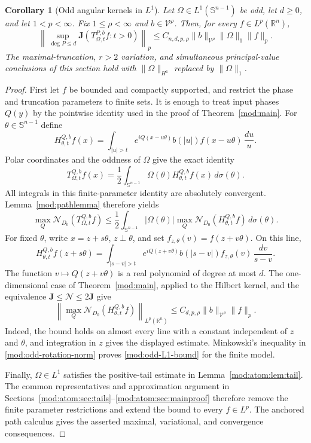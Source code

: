 \documentclass[11pt]{article}
\numberwithin{equation}{section}
\newtheorem{corollary}[theorem]{Corollary}
\theoremstyle{remark}
\theoremstyle{definition}
\newcommand{\R}{\mathbb R}
\newcommand{\Sph}{\mathbb S}
\newcommand{\NN}{\mathcal N}
\begin{document}
\begin{corollary}[Odd angular kernels in \texorpdfstring{$L^1$}{L1}]
\label{mod:odd-L1}
Let $\Omega\in L^1(\Sph^{n-1})$ be odd, let $d\ge0$, and let
$1<p<\infty$. Fix $1\le\rho<\infty$ and $b\in\mathcal V^\rho$.
Then, for every $f\in L^p(\R^n)$,
\begin{equation}\label{mod:odd-L1-bound}
 \left\|\sup_{\deg P\le d}
 \mathbf J(T^{P,b}_{\Omega,t}f:t>0)\right\|_p
 \le C_{n,d,p,\rho}\|b\|_{\mathcal V^\rho}\|\Omega\|_1\|f\|_p.
\end{equation}
The maximal-truncation, $r>2$ variation, and simultaneous principal-value
conclusions of this section hold with $\|\Omega\|_{H^1}$ replaced by
$\|\Omega\|_1$.
\end{corollary}
\begin{proof}
First let $f$ be bounded and compactly supported, and restrict the phase
and truncation parameters to finite sets. It is enough to treat input
phases $Q(y)$ by the pointwise identity used in the proof of
Theorem~\ref{mod:main}. For $\theta\in\Sph^{n-1}$ define
\[
 H^{Q,b}_{\theta,t}f(x)
 =\int_{|u|>t}e^{iQ(x-u\theta)}b(|u|)f(x-u\theta)\,\frac{du}{u}.
\]
Polar coordinates and the oddness of $\Omega$ give the exact identity
\begin{equation}\label{mod:odd-rotation-identity}
 T^{Q,b}_{\Omega,t}f(x)
 =\frac12\int_{\Sph^{n-1}}
 \Omega(\theta)H^{Q,b}_{\theta,t}f(x)\,d\sigma(\theta).
\end{equation}
All integrals in this finite-parameter identity are absolutely convergent.
Lemma~\ref{mod:pathlemma} therefore yields
\begin{equation}\label{mod:odd-rotation-norm}
 \max_Q\NN_{D_0}(T^{Q,b}_{\Omega,t}f)
 \le\frac12\int_{\Sph^{n-1}}|\Omega(\theta)|
 \max_Q\NN_{D_0}(H^{Q,b}_{\theta,t}f)\,d\sigma(\theta).
\end{equation}
For fixed $\theta$, write $x=z+s\theta$, $z\perp\theta$, and set
$f_{z,\theta}(v)=f(z+v\theta)$. On this line,
\[
 H^{Q,b}_{\theta,t}f(z+s\theta)
 =\int_{|s-v|>t}
 e^{iQ(z+v\theta)}b(|s-v|)f_{z,\theta}(v)\,\frac{dv}{s-v}.
\]
The function $v\mapsto Q(z+v\theta)$ is a real polynomial of degree at
most $d$. The one-dimensional case of Theorem~\ref{mod:main}, applied to
the Hilbert kernel, and the equivalence
$\mathbf J\le\NN\le2\mathbf J$ give
\[
 \left\|\max_Q\NN_{D_0}(H^{Q,b}_{\theta,t}f)\right\|_{L^p(\R^n)}
 \le C_{d,p,\rho}\|b\|_{\mathcal V^\rho}\|f\|_p.
\]
Indeed, the bound holds on almost every line with a constant independent
of $z$ and $\theta$, and integration in $z$ gives the displayed estimate.
Minkowski's inequality in \eqref{mod:odd-rotation-norm} proves
\eqref{mod:odd-L1-bound} for the finite model.

Finally, $\Omega\in L^1$ satisfies the positive-tail estimate in
Lemma~\ref{mod:atom:lem:tail}. The common representatives and approximation
argument in Sections~\ref{mod:atom:sec:tails}--\ref{mod:atom:sec:mainproof}
therefore remove the finite parameter restrictions and extend the bound
to every $f\in L^p$. The anchored path calculus gives the asserted
maximal, variational, and convergence consequences.
\end{proof}
\end{document}
